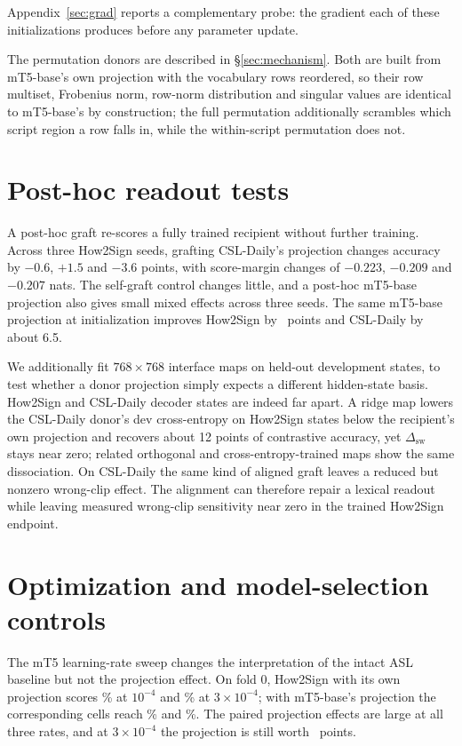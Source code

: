 \documentclass[11pt]{article}
\begin{document}
Appendix~\ref{sec:grad} reports a complementary probe: the gradient each of
these initializations produces before any parameter update.

The permutation donors are described in \S\ref{sec:mechanism}. Both are built
from mT5-base's own projection with the vocabulary rows reordered, so their row
multiset, Frobenius norm, row-norm distribution and singular values are identical
to mT5-base's by construction; the full permutation additionally scrambles which
script region a row falls in, while the within-script permutation does not.

\section{Post-hoc readout tests}
\label{sec:posthoc}

A post-hoc graft re-scores a fully trained recipient without further training.
Across three How2Sign seeds, grafting CSL-Daily's projection changes accuracy by
$-0.6$, $+1.5$ and $-3.6$ points, with score-margin changes of $-0.223$, $-0.209$
and $-0.207$ nats. The self-graft control changes little, and a post-hoc
mT5-base projection also gives small mixed effects across three seeds. The same
mT5-base projection at initialization improves How2Sign by
\HeadBaseGainLexDeltaAbs\ points and CSL-Daily by about 6.5.

We additionally fit $768\times768$ interface maps on held-out development states,
to test whether a donor projection simply expects a different hidden-state basis.
How2Sign and CSL-Daily decoder states are indeed far apart. A ridge map lowers
the CSL-Daily donor's dev cross-entropy on How2Sign states below the recipient's
own projection and recovers about 12 points of contrastive accuracy, yet
$\Delta_{\mathrm{sw}}$ stays near zero; related orthogonal and
cross-entropy-trained maps show the same dissociation. On CSL-Daily the same kind
of aligned graft leaves a reduced but nonzero wrong-clip effect. The alignment
can therefore repair a lexical readout while leaving measured wrong-clip
sensitivity near zero in the trained How2Sign endpoint.

\section{Optimization and model-selection controls}
\label{sec:optapp}

The mT5 learning-rate sweep changes the interpretation of the intact ASL baseline
but not the projection effect. On fold 0, How2Sign with its own projection scores
\HowtwosignLrOneEFourLexLocal\% at $10^{-4}$ and
\HowtwosignLrThreeEFourLexLocal\% at $3\times10^{-4}$; with mT5-base's projection
the corresponding cells reach \HeadHowBaseLrOneEFourLexLocal\% and
\HeadHowBaseLrThreeEFourLexLocal\%. The paired projection effects are large at
all three rates, and at $3\times10^{-4}$ the projection is still worth
\HeadGainAtLrThreeEFourLexDeltaAbs\ points.
\end{document}
